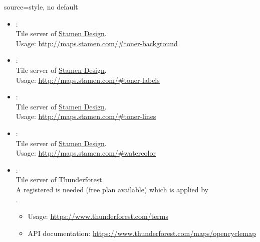 \begin{docMrcKey}[supply]{source}{=}{style, no default}
\begin{itemize}
  \item{}:\\
    Tile server of \href{http://stamen.com}{Stamen Design}.\\
    Usage: \url{http://maps.stamen.com/#toner-background}

  \item{}:\\
    Tile server of \href{http://stamen.com}{Stamen Design}.\\
    Usage: \url{http://maps.stamen.com/#toner-labels}

\clearpage
  \item{}:\\
    Tile server of \href{http://stamen.com}{Stamen Design}.\\
    Usage: \url{http://maps.stamen.com/#toner-lines}

  \item{}:\\
    Tile server of \href{http://stamen.com}{Stamen Design}.\\
    Usage: \url{http://maps.stamen.com/#watercolor}

  \item{}:\\
    Tile server of \href{https://www.thunderforest.com}{Thunderforest}.\\
    A registered  is needed (free plan available)
    which is applied by\\
    .
    \begin{itemize}
    \item Usage: \url{https://www.thunderforest.com/terms}
    \item API documentation: \url{https://www.thunderforest.com/maps/opencyclemap}
    \end{itemize}


\end{itemize}
\end{docMrcKey}
